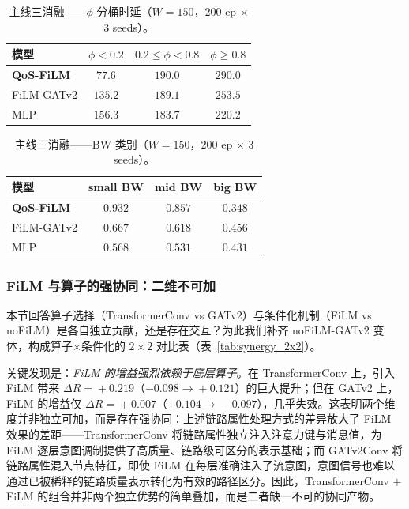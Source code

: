 \begin{table}[t]
\centering
\caption{主线三消融——$\phi$ 分桶时延（$W\!=\!150$，200 ep × 3 seeds）。}
\label{tab:conv_w150_phi}
\setlength{\tabcolsep}{3pt}
\begin{tabular}{lccc}

\toprule
模型 & $\phi<0.2$ & $0.2\!\le\!\phi\!<\!0.8$ & $\phi\!\ge\!0.8$ \\
\midrule
\textbf{QoS-FiLM} & $\mathbf{77.6}$ & $190.0$ & $290.0$ \\
FiLM-GATv2       & $135.2$ & $189.1$ & $253.5$ \\
MLP              & $156.3$ & $183.7$ & $220.2$ \\
\bottomrule

\end{tabular}
\end{table}

\begin{table}[t]
\centering
\caption{主线三消融——BW 类别（$W\!=\!150$，200 ep × 3 seeds）。}
\label{tab:conv_w150_bw}
\setlength{\tabcolsep}{3pt}
\begin{tabular}{lccc}
\toprule
模型 & small BW & mid BW & big BW \\
\midrule
\textbf{QoS-FiLM} & $\mathbf{0.932}$ & $\mathbf{0.857}$ & $0.348$ \\
FiLM-GATv2       & $0.667$ & $0.618$ & $0.456$ \\
MLP              & $0.568$ & $0.531$ & $0.431$ \\
\bottomrule
\end{tabular}
\end{table}

\subsubsection{FiLM 与算子的强协同：二维不可加}
\label{sec:exp:synergy}

本节回答算子选择（TransformerConv vs GATv2）与条件化机制（FiLM vs noFiLM）是各自独立贡献，还是存在交互？为此我们补齐 noFiLM-GATv2 变体，构成算子$\times$条件化的 $2\times2$ 对比表（表~\ref{tab:synergy_2x2}）。

关键发现是：\emph{FiLM 的增益强烈依赖于底层算子}。在 TransformerConv 上，引入 FiLM 带来 $\Delta R\!=\!+0.219$（$-0.098\!\to\!+0.121$）的巨大提升；但在 GATv2 上，FiLM 的增益仅 $\Delta R\!=\!+0.007$（$-0.104\!\to\!-0.097$），几乎失效。这表明两个维度并非独立可加，而是存在强协同：上述链路属性处理方式的差异放大了 FiLM 效果的差距——TransformerConv 将链路属性独立注入注意力键与消息值，为 FiLM 逐层意图调制提供了高质量、链路级可区分的表示基础；而 GATv2Conv 将链路属性混入节点特征，即使 FiLM 在每层准确注入了流意图，意图信号也难以通过已被稀释的链路质量表示转化为有效的路径区分。因此，TransformerConv $+$ FiLM 的组合并非两个独立优势的简单叠加，而是二者缺一不可的协同产物。


